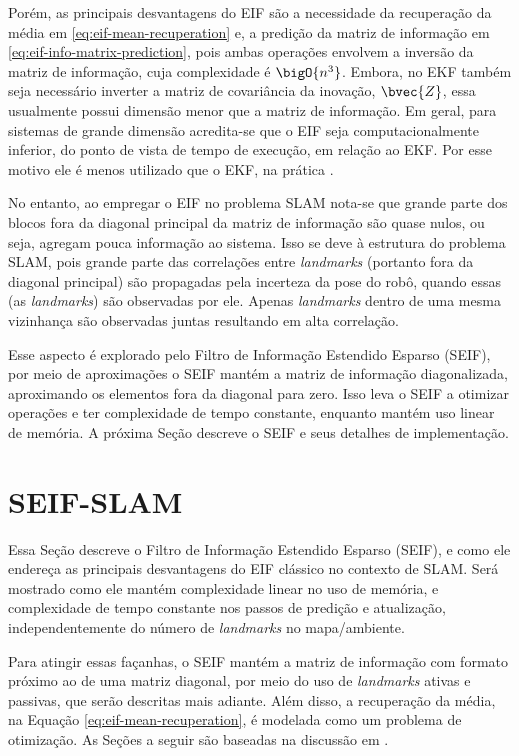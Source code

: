 Porém, as principais desvantagens do EIF são a necessidade da recuperação da média em \ref{eq:eif-mean-recuperation} e, a predição da matriz de informação em 
\ref{eq:eif-info-matrix-prediction}, pois ambas operações envolvem a inversão 
da matriz de informação, cuja complexidade é $\bigO{n^3}$. Embora, no EKF 
também seja 
necessário inverter a matriz de covariância da inovação, $\bvec{Z}$, 
essa usualmente possui dimensão menor que a matriz de informação. 
Em geral, para sistemas de grande dimensão acredita-se que o EIF seja 
computacionalmente inferior, do ponto de vista de tempo de execução, em relação 
ao EKF. Por esse motivo ele é menos utilizado que o EKF, na prática 
\cite[p.~78]{bongard2006probabilistic}.

No entanto, ao empregar o EIF no problema SLAM nota-se que grande parte dos 
blocos fora da diagonal principal da matriz de informação são quase nulos, ou 
seja, agregam pouca informação ao sistema. Isso se deve à estrutura do problema 
SLAM, pois grande parte das correlações entre \textit{landmarks} (portanto 
fora da diagonal principal) são propagadas pela incerteza da pose do robô, 
quando essas (as \textit{landmarks}) são observadas por ele. Apenas 
\textit{landmarks} dentro de uma mesma vizinhança são observadas juntas 
resultando em alta correlação.

Esse aspecto é explorado pelo Filtro de Informação Estendido Esparso (SEIF), 
por meio de aproximações o SEIF mantém a matriz de informação diagonalizada, 
aproximando os elementos fora da diagonal para zero. Isso leva o SEIF a otimizar 
operações e ter complexidade de tempo constante, enquanto mantém uso linear de 
memória. A próxima Seção descreve o SEIF e seus detalhes de implementação.

\section{SEIF-SLAM}
Essa Seção descreve o Filtro de Informação Estendido Esparso (SEIF), e 
como ele endereça as principais desvantagens do EIF clássico no 
contexto de SLAM. Será mostrado como ele mantém complexidade 
linear no uso de memória, e complexidade de tempo constante nos passos de predição e atualização, independentemente do número de 
\textit{landmarks} no mapa/ambiente.

Para atingir essas façanhas, o SEIF mantém a matriz de informação 
com formato próximo ao de uma matriz diagonal, por meio do uso de 
\textit{landmarks} ativas e passivas, que serão descritas mais adiante. 
Além disso, a recuperação da média, na Equação 
\ref{eq:eif-mean-recuperation}, é modelada como um problema de 
otimização. As Seções a seguir são baseadas na discussão em \cite[Capítulo~12.4]{bongard2006probabilistic}.

